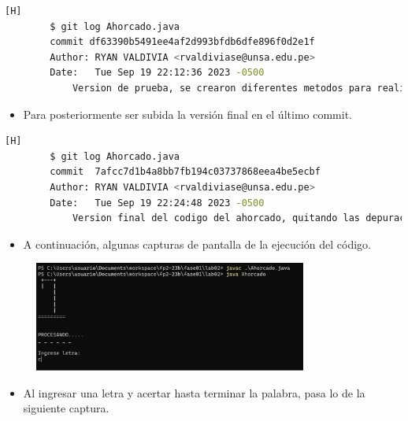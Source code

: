 \documentclass{article}
\begin{document}
	\begin{lstlisting}[language=bash,caption={Subiendo muchos cambios y creaciones de métodos}][H]
		$ git log Ahorcado.java
		commit df63390b5491ee4af2d993bfdb6dfe896f0d2e1f
		Author: RYAN VALDIVIA <rvaldiviase@unsa.edu.pe>
		Date:   Tue Sep 19 22:12:36 2023 -0500
			Version de prueba, se crearon diferentes metodos para realizar comprobaciones y que sea un juego del ahorcado completamente jugable y sea visual para el usuario
	\end{lstlisting}
	\begin{itemize}
		\item Para posteriormente ser subida la versión final en el último commit.
	\end{itemize}
	\begin{lstlisting}[language=bash,caption={La versión final}][H]
		$ git log Ahorcado.java
		commit  7afcc7d1b4a8bb7fb194c03737868eea4be5ecbf
		Author: RYAN VALDIVIA <rvaldiviase@unsa.edu.pe>
		Date:   Tue Sep 19 22:24:48 2023 -0500
			Version final del codigo del ahorcado, quitando las depuraciones y haciendo algunos ajustes mas
	\end{lstlisting}
	\begin{itemize}
		\item A continuación, algunas capturas de pantalla de la ejecución del código.
	\end{itemize}
	\begin{figure}[H]
		\centering
		\includegraphics[width=0.8\textwidth,keepaspectratio]{img/captura1.png}
	\end{figure}
	\begin{itemize}
		\item Al ingresar una letra y acertar hasta terminar la palabra, pasa lo de la siguiente captura.
	\end{itemize}
\end{document}
